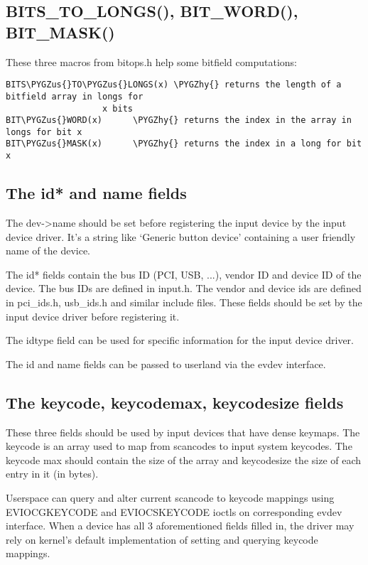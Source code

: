 \documentclass[a4paper,8pt,english]{sphinxmanual}
\def\PYGZus{\char`\_}
\def\PYGZhy{\char`\-}
\begin{document}
\subsection{BITS\_TO\_LONGS(), BIT\_WORD(), BIT\_MASK()}
\label{input/input-programming:bits-to-longs-bit-word-bit-mask}
These three macros from bitops.h help some bitfield computations:

\begin{Verbatim}[commandchars=\\\{\}]
BITS\PYGZus{}TO\PYGZus{}LONGS(x) \PYGZhy{} returns the length of a bitfield array in longs for
                   x bits
BIT\PYGZus{}WORD(x)      \PYGZhy{} returns the index in the array in longs for bit x
BIT\PYGZus{}MASK(x)      \PYGZhy{} returns the index in a long for bit x
\end{Verbatim}


\subsection{The id* and name fields}
\label{input/input-programming:the-id-and-name-fields}
The dev-\textgreater{}name should be set before registering the input device by the input
device driver. It's a string like `Generic button device' containing a
user friendly name of the device.

The id* fields contain the bus ID (PCI, USB, ...), vendor ID and device ID
of the device. The bus IDs are defined in input.h. The vendor and device ids
are defined in pci\_ids.h, usb\_ids.h and similar include files. These fields
should be set by the input device driver before registering it.

The idtype field can be used for specific information for the input device
driver.

The id and name fields can be passed to userland via the evdev interface.


\subsection{The keycode, keycodemax, keycodesize fields}
\label{input/input-programming:the-keycode-keycodemax-keycodesize-fields}
These three fields should be used by input devices that have dense keymaps.
The keycode is an array used to map from scancodes to input system keycodes.
The keycode max should contain the size of the array and keycodesize the
size of each entry in it (in bytes).

Userspace can query and alter current scancode to keycode mappings using
EVIOCGKEYCODE and EVIOCSKEYCODE ioctls on corresponding evdev interface.
When a device has all 3 aforementioned fields filled in, the driver may
rely on kernel's default implementation of setting and querying keycode
mappings.
\end{document}
